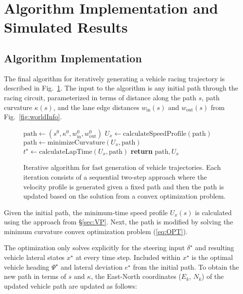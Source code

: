  
\section{Algorithm Implementation and Simulated \newline Results}
\label{sec:IMPLEMENT}
\subsection{Algorithm Implementation}
The final algorithm for iteratively
generating a vehicle racing trajectory is described in Fig.~\ref{algorithmDesc}. 
The input to the algorithm is any initial path through the racing circuit, 
parameterized in terms of distance along the path $s$, path curvature $\kappa(s)$, and the lane edge distances $w_\mathrm{in}(s)$ and 
$w_\mathrm{out}(s)$ from Fig.~\ref{fig:worldInfo}.
 \begin{figure}
\begin{algorithmic}[1]
\State $\mathrm{path}\gets (s^0, \kappa^0, w_\mathrm{in}^0, w_\mathrm{out}^0)$
\State $U_x \gets \mathrm{calculateSpeedProfile(path)}$
\State $\mathrm{path} \gets \mathrm{minimizeCurvature}(U_x, \mathrm{path})$
\State $t^\star \gets \mathrm{calculateLapTime}(U_x,\mathrm{path})$
\EndWhile
\State \textbf{return} $\mathrm{path},U_x$
\EndProcedure
\end{algorithmic}
\caption[Iterative algorithm for fast generation of vehicle trajectories.]{Iterative algorithm for fast generation of vehicle trajectories. Each iteration consists of a sequential two-step approach where
the velocity profile is generated given a fixed path and then the path is updated based on the solution from a convex optimization problem.}\label{algorithmDesc}
\end{figure}

 Given the initial path, the minimum-time speed profile $U_x(s)$ is calculated using the
approach from \S \ref{sec:VP}. Next, the path is modified by solving the minimum curvature
 convex optimization problem (\ref{eq:OPT}). 
 

 
The optimization only solves explicitly for the steering input $\delta^\star$ and resulting vehicle lateral states $x^\star$ at every 
time step. Included within $x^\star$  is the optimal vehicle heading $\Psi^\star$ and lateral deviation $e^\star$ from the initial path. To obtain 
the new path in terms of $s$ and $\kappa$, the East-North coordinates ($E_k$, $N_k$) of the updated vehicle path are updated as follows:
	
